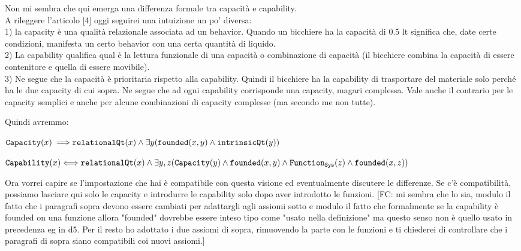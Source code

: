 \documentclass[sw]{iosart2x}
\newcommand{\bflist}{\begin{list}{}{\setlength{\topsep}{2mm}\setlength{\partopsep}{0mm}\setlength{\parsep}{0mm}\setlength{\leftmargin}{9mm}\setlength{\labelwidth}{8mm}}}
\newcommand{\eflist}{\end{list}}
\newcommand{\AxLabel}{\textrm{a}}
\newcounter{cntax}
\newcommand{\myax}[1]{\refstepcounter{cntax}\begin{small}{\bf \AxLabel\thecntax\label{ax:#1}}\end{small}}
\newcommand{\generalStyle}[1]{\texttt{#1}}
\newcommand{\biRel}[3]{\generalStyle{#1}(#2,#3)}
\newcommand{\uniRel}[2]{\generalStyle{#1}(#2)}
\newcommand{\uniRelPar}[3]{\generalStyle{#1}_{\generalStyle{#3}}(#2)}
\newcommand{\myiff}{\Longleftrightarrow}
\newcommand{\myfi}{\hspace{0.9mm} \Longrightarrow}
\newcommand{\Capability}[1]{\uniRel{Capability}{#1}}
\newcommand{\Capacity}[1]{\uniRel{Capacity}{#1}}
\newcommand{\RelationalQuality}[1]{\uniRel{relationalQt}{#1}}
\newcommand{\IntrinsicQuality}[1]{\uniRel{intrinsicQt}{#1}}
\newcommand{\FunctionSys}[1]{\uniRelPar{Function}{#1}{Sys}}
\newcommand{\founded}[2]{\biRel{\foundedTerm{passive}}{#1}{#2}}
\newcommand{\foundedTerm}[1]{%
  \ifthenelse{\equal{#1}{passive}}{founded}{%
    \ifthenelse{\equal{#1}{verb}}{found}{%
      \ifthenelse{\equal{#1}{gerund}}{founding}{%
        ERROR!%
      }%
    }%
  }%
}
\newcommand{\TODO}[1]{{\color{red} #1}}
\begin{document}
\TODO{Non mi sembra che qui emerga una differenza formale tra capacità e capability.\\ 
A rileggere l'articolo [4] oggi seguirei una intuizione un po' diversa:\\ 
1) la capacity è una qualità relazionale associata ad un behavior. Quando un bicchiere ha la capacità di 0.5 lt significa che, date certe condizioni, manifesta un certo behavior con una certa quantità di liquido.\\
2) La capability qualifica qual è la lettura funzionale di una capacità o combinazione di capacità (il bicchiere combina la capacità di essere contenitore e quella di essere movibile). \\
3) Ne segue che la capacità è prioritaria rispetto alla capability. Quindi il bicchiere ha la capability di trasportare del materiale solo perché ha le due capacity di cui sopra.
Ne segue che ad ogni capability corrisponde una capacity, magari complessa. Vale anche il contrario per le capacity semplici e anche per alcune combinazioni di capacity complesse (ma secondo me non tutte).

Quindi avremmo:
\bflist
\item[\myax{subsumptionCapacSB}]  $\Capacity{x} \myfi \RelationalQuality{x} \land  \exists y (\founded{x}{y} \land \IntrinsicQuality{y}) $
\item[\myax{subsumptionCapab}] $ \Capability{x} \myiff  \RelationalQuality{x} \land \exists y,z(\Capacity{y} \land \founded{x}{y} \land \FunctionSys{z} \land \founded{x}{z}) $  
\eflist
Ora vorrei capire se l'impostazione che hai è compatibile con questa visione ed eventualmente discutere le differenze. Se c'è compatibilità, possiamo lasciare qui solo le capacity e introdurre le capability solo dopo aver introdotto le funzioni.
[FC: mi sembra che lo sia, modulo il fatto che i paragrafi sopra devono essere cambiati per adattargli agli assiomi sotto e modulo il fatto che formalmente se la capability è founded on una funzione allora "founded" dovrebbe essere inteso tipo come "usato nella definizione" ma questo senso non è quello usato in precedenza eg in d5. Per il resto ho adottato i due assiomi di sopra, rimuovendo la parte con le funzioni e ti chiederei di controllare che i paragrafi di sopra siano compatibili coi nuovi assiomi.]}
\end{document}
